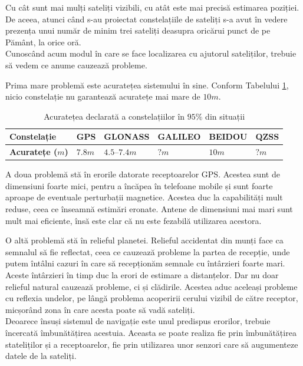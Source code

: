 \documentclass[12pt,a4paper]{article}
\begin{document}
Cu cât sunt mai mulți sateliți vizibili, cu atât este mai precisă estimarea poziției. De aceea, atunci când s-au proiectat constelațiile de sateliți s-a avut în vedere prezența unui număr de minim trei sateliți deasupra oricărui punct de pe Pământ, la orice oră.\\

Cunoscând acum modul în care se face localizarea cu ajutorul sateliților, trebuie să vedem ce anume cauzează probleme.

Prima mare problemă este acuratețea sistemului în sine. Conform Tabelului \ref{tab:accuracy_table}, nicio constelație nu garantează acuratețe mai mare de $10m$.

\begin{table}[h]
\centering
    \begin{tabular}{ | l | l | l | l | l | l |}
    \hline
    \textbf{Constelație} & GPS & GLONASS & GALILEO & BEIDOU & QZSS \\ \hline
    \textbf{Acuratețe ($m$)} & $7.8m$ \cite{GPSAccuracy} & $ 4.5–7.4m$ \cite{GLONASSAccuracy} & $?m$ & $10m$ \cite{BeiDouAccuracy} & $?m$ \\ \hline
    \end{tabular}
    
    \caption{Acuratețea declarată a constelațiilor în $95\%$ din situații}
    \label{tab:accuracy_table}
\end{table}

A doua problemă stă în erorile datorate receptoarelor GPS. Acestea sunt de dimensiuni foarte mici, pentru a încăpea în telefoane mobile și sunt foarte aproape de eventuale perturbații magnetice. Acestea duc la capabilități mult reduse, ceea ce înseamnă estimări eronate. Antene de dimensiuni mai mari sunt mult mai eficiente, însă este clar că nu este fezabilă utilizarea acestora.

O altă problemă stă în relieful planetei. Relieful accidentat din munți face ca semnalul să fie reflectat, ceea ce cauzează probleme la partea de recepție, unde putem întâlni cazuri în care să recepționăm semnale cu întârzieri foarte mari. Aceste întârzieri în timp duc la erori de estimare a distanțelor. Dar nu doar relieful natural cauzează probleme, ci și clădirile. Acestea aduc aceleași probleme cu reflexia undelor, pe lângă problema acoperirii cerului vizibil de către receptor, micșorând zona în care acesta poate să vadă sateliți.\\

Deoarece însuși sistemul de navigație este unul predispus erorilor, trebuie încercată îmbunătățirea acestuia. Aceasta se poate realiza fie prin îmbunătățirea stateliților și a receptoarelor, fie prin utilizarea unor senzori care să augumenteze datele de la sateliți.
\end{document}
